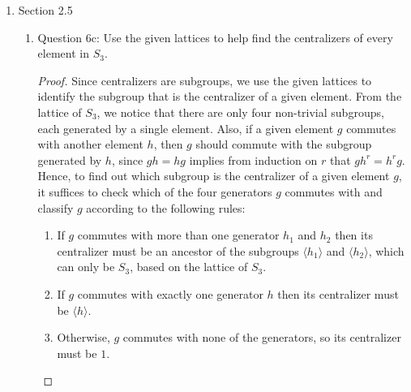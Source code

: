 \documentclass{article}
\begin{document}
\begin{enumerate}
\begin{enumerate}
\begin{proof}
          Next, we check commutativity with the 4-cycles. Clearly $A$
          commutes with itself and hence with any 4-cycle in its cyclic
          subgroup. We check that $A$ does not commute with $(1,2,4,3)$,
          $(1,3,4,2)$, $(1,3,2,4)$, $(1,4,2,3)$, or $(1,4,3,2)$. Any other
          4-cycle not in $\langle A\rangle$ generates a cyclic
          subgroup that contains one of these non-commutating elements, so
          the only 4-cycles that commute with $A$ are those in its cyclic
          subgroup. Finally, we check for commutativity with the disjoint
          2-cycles. We check that $A$ does not commute with $(1,2)(3,4)$,
          $(1,3)(2,4)$, or $(1,4)(2,3)$, which are all possible
          disjoint 2-cycles. We conclude that the centralizer of $A$ is the
          its cyclic subgroup, which is $\langle(1,2,3,4)\rangle$. \\

          Next, we find the normalizer of $A$.
        \end{proof}
    \end{enumerate}

  \item Section 2.5
    \begin{enumerate}
      \item Question 6c: Use the given lattices to help find the
        centralizers of every element in $S_3$.
        \begin{proof}
          Since centralizers are subgroups, we use the given lattices to
          identify the subgroup that is the centralizer of a given element.
          From the lattice of $S_3$, we notice that there are only four
          non-trivial subgroups, each generated by a single element. Also,
          if a given element $g$ commutes with another element $h$, then
          $g$ should commute with the subgroup generated by $h$, since
          $gh=hg$ implies from induction on $r$ that $gh^r=h^rg$. Hence, to
          find out which subgroup is the centralizer of a given element
          $g$, it suffices to check which of the four generators $g$
          commutes with and classify $g$ according to the following rules:
          \begin{enumerate}
            \item If $g$ commutes with more than one generator $h_1$ and
              $h_2$ then its centralizer must be an ancestor of the
              subgroups $\langle h_1\rangle$ and $\langle h_2\rangle$,
              which can only be $S_3$, based on the lattice of $S_3$.
            \item If $g$ commutes with exactly one generator $h$ then its
              centralizer must be $\langle h\rangle$.
            \item Otherwise, $g$ commutes with none of the generators, so
              its centralizer must be $1$.
          \end{enumerate}


\end{proof}
\end{enumerate}
\end{enumerate}
\end{document}
